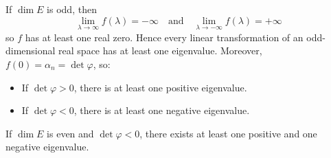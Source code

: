 If $\dim E$ is odd, then
$$\lim_{\lambda \to \infty} f(\lambda) = -\infty \quad \text{and} \quad \lim_{\lambda \to -\infty} f(\lambda) = +\infty$$
so $f$ has at least one real zero. Hence every linear transformation of an odd-dimensional real space has at least one eigenvalue. Moreover, $f(0) = \alpha_n = \det \varphi$, so:
\begin{itemize}
  \item If $\det \varphi > 0$, there is at least one positive eigenvalue.
  \item If $\det \varphi < 0$, there is at least one negative eigenvalue.
\end{itemize}
If $\dim E$ is even and $\det \varphi < 0$, there exists at least one positive and one negative eigenvalue.
